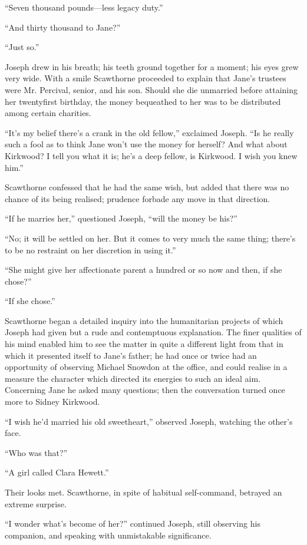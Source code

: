 ``Seven thousand pounds---less legacy duty.''

``And thirty thousand to Jane?''

``Just so.''

Joseph drew in his breath; his teeth ground together for a moment; his
eyes grew very wide. With a smile Scawthorne proceeded to explain that
Jane's trustees were Mr. Percival, senior, and his son. Should she {}die
unmarried before attaining her twentyfirst birthday, the money
bequeathed to her was to be distributed among certain charities.

``It's my belief there's a crank in the old fellow,'' exclaimed Joseph.
``Is he really such a fool as to think Jane won't use the money for
herself? And what about Kirkwood? I tell you what it is; he's a deep
fellow, is Kirkwood. I wish you knew him.''

Scawthorne confessed that he had the same wish, but added that there was
no chance of its being realised; prudence forbade any move in that
direction.

``If he marries her,'' questioned Joseph, ``will the money be his?''

``No; it will be settled on her. But it comes to very much the same
thing; there's to be no restraint on her discretion in using it.''

``She might give her affectionate parent a hundred or so now and then,
if she chose?''

``If she chose.''

Scawthorne began a detailed inquiry into the humanitarian projects of
which Joseph had given but a rude and contemptuous {}explanation. The
finer qualities of his mind enabled him to see the matter in quite a
different light from that in which it presented itself to Jane's father;
he had once or twice had an opportunity of observing Michael Snowdon at
the office, and could realise in a measure the character which directed
its energies to such an ideal aim. Concerning Jane he asked many
questions; then the conversation turned once more to Sidney Kirkwood.

``I wish he'd married his old sweetheart,'' observed Joseph, watching
the other's face.

``Who was that?''

``A girl called Clara Hewett.''

Their looks met. Scawthorne, in spite of habitual self-command, betrayed
an extreme surprise.

``I wonder what's become of her?'' continued Joseph, still observing his
companion, and speaking with unmistakable significance.

